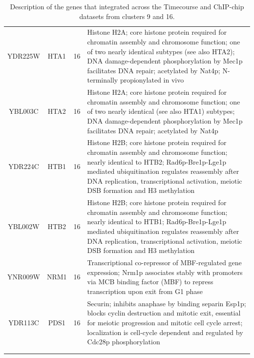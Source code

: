 \documentclass[]{article}
\begin{document}
\begin{longtable}{@{\extracolsep{3pt}} cccp{85mm}}
YDR225W & HTA1 & 16 & Histone H2A; core histone protein required for chromatin assembly and chromosome function; one of two nearly identical subtypes (see also HTA2); DNA damage-dependent phosphorylation by Mec1p facilitates DNA repair; acetylated by Nat4p; N-terminally propionylated in vivo \\ 
YBL003C & HTA2 & 16 & Histone H2A; core histone protein required for chromatin assembly and chromosome function; one of two nearly identical (see also HTA1) subtypes; DNA damage-dependent phosphorylation by Mec1p facilitates DNA repair; acetylated by Nat4p \\ 
YDR224C & HTB1 & 16 & Histone H2B; core histone protein required for chromatin assembly and chromosome function; nearly identical to HTB2; Rad6p-Bre1p-Lge1p mediated ubiquitination regulates reassembly after DNA replication, transcriptional activation, meiotic DSB formation and H3 methylation \\ 
YBL002W & HTB2 & 16 & Histone H2B; core histone protein required for chromatin assembly and chromosome function; nearly identical to HTB1; Rad6p-Bre1p-Lge1p mediated ubiquitination regulates reassembly after DNA replication, transcriptional activation, meiotic DSB formation and H3 methylation \\ 
YNR009W & NRM1 & 16 & Transcriptional co-repressor of MBF-regulated gene expression; Nrm1p associates stably with promoters via MCB binding factor (MBF) to repress transcription upon exit from G1 phase \\ 
YDR113C & PDS1 & 16 & Securin; inhibits anaphase by binding separin Esp1p; blocks cyclin destruction and mitotic exit, essential for meiotic progression and mitotic cell cycle arrest; localization is cell-cycle dependent and regulated by Cdc28p phosphorylation \\   \hline \\ [-1.8ex] 
\caption{Description of the genes that integrated across the Timecourse and ChIP-chip datasets from clusters 9 and 16.}
\label{tab:timecoursChIPchipFusedCl916}
\end{longtable} 
%
\end{document}
